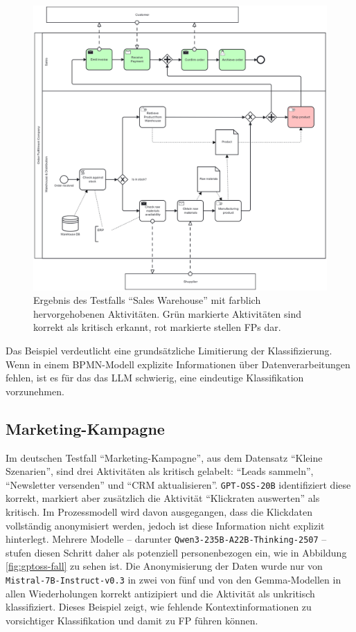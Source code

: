 \begin{figure}
    \centering
    \includegraphics[height=.41\textheight]{images/results/examples/qwen3-235B-run-3-uni-sales-warehouse}
    \caption{Ergebnis des Testfalls \enquote{Sales Warehouse} mit farblich hervorgehobenen Aktivitäten. Grün markierte Aktivitäten sind korrekt als kritisch erkannt, rot markierte stellen \acp{FP} dar.}
    \label{fig:qwen3-fall}
\end{figure}

Das Beispiel verdeutlicht eine grundsätzliche Limitierung der Klassifizierung. Wenn in einem \ac{BPMN}-Modell explizite Informationen über Datenverarbeitungen fehlen, ist es für das das \ac{LLM} schwierig, eine eindeutige Klassifikation vorzunehmen.

\subsection*{Marketing-Kampagne}

Im deutschen Testfall \enquote{Marketing-Kampagne}, aus dem Datensatz \enquote{Kleine Szenarien}, sind drei Aktivitäten als kritisch gelabelt: \enquote{Leads sammeln}, \enquote{Newsletter versenden} und \enquote{CRM aktualisieren}. \texttt{GPT-OSS-20B} identifiziert diese korrekt, markiert aber zusätzlich die Aktivität \enquote{Klickraten auswerten} als kritisch. Im Prozessmodell wird davon ausgegangen, dass die Klickdaten vollständig anonymisiert werden, jedoch ist diese Information nicht explizit hinterlegt. Mehrere Modelle – darunter \texttt{Qwen3-235B-A22B-Thinking-2507} – stufen diesen Schritt daher als potenziell personenbezogen ein, wie in Abbildung \ref{fig:gptoss-fall} zu sehen ist. Die Anonymisierung der Daten wurde nur von \texttt{Mistral-7B-Instruct-v0.3} in zwei von fünf und von den Gemma-Modellen in allen Wiederholungen korrekt antizipiert und die Aktivität als unkritisch klassifiziert. Dieses Beispiel zeigt, wie fehlende Kontextinformationen zu vorsichtiger Klassifikation und damit zu \ac{FP} führen können.

